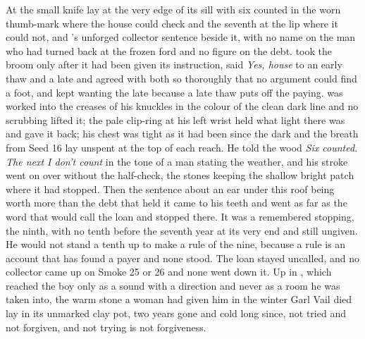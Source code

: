 At  the small knife lay at the very edge of its sill with six counted in the worn thumb-mark where the house could check and the seventh at the lip where it could not, and 's unforged collector sentence beside it, with no name on the man who had turned back at the frozen ford and no figure on the debt.  took the broom only after it had been given its instruction, said \emph{Yes, house} to an early thaw and a late and agreed with both so thoroughly that no argument could find a foot, and kept wanting the late because a late thaw puts off the paying.  was worked into the creases of his knuckles in the colour of the clean dark line and no scrubbing lifted it; the pale clip-ring at his left wrist held what light there was and gave it back; his chest was tight as it had been since the dark and the breath from Seed 16 lay unspent at the top of each reach. He told the wood \emph{Six counted. The next I don't count} in the tone of a man stating the weather, and his stroke went on over  without the half-check, the stones keeping the shallow bright patch where it had stopped. Then the sentence about an ear under this roof being worth more than the debt that held it came to his teeth and went as far as the word that would call the loan and stopped there. It was a remembered stopping, the ninth, with no tenth before the seventh year at its very end and still ungiven. He would not stand a tenth up to make a rule of the nine, because a rule is an account that has found a payer and none stood. The loan stayed uncalled, and no collector came up  on Smoke 25 or 26 and none went down it. Up in , which reached the boy only as a sound with a direction and never as a room he was taken into, the warm stone a woman had given him in the winter Garl Vail died lay in its unmarked clay pot, two years gone and cold long since, not tried and not forgiven, and not trying is not forgiveness.

